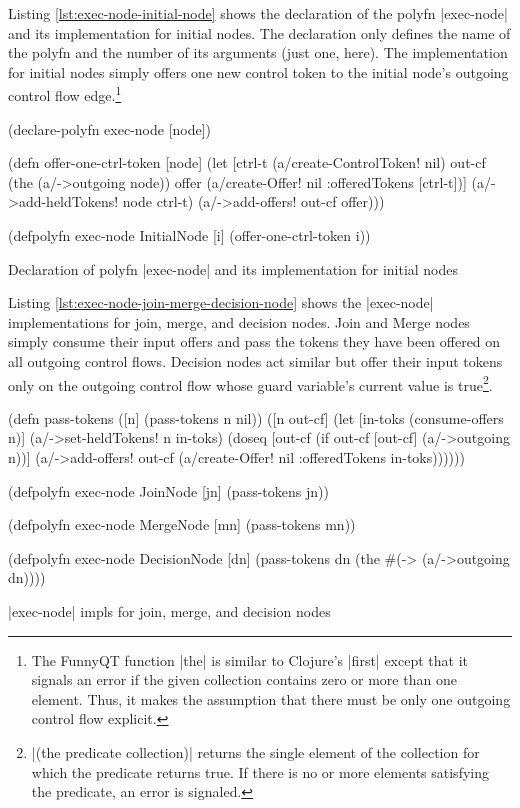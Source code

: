 \documentclass[submission]{eptcs}
\newcommand{\code}{\clojureinline}
\begin{document}
Listing \vref{lst:exec-node-initial-node} shows the declaration of the polyfn
\code|exec-node| and its implementation for initial nodes.  The declaration
only defines the name of the polyfn and the number of its arguments (just one,
here).  The implementation for initial nodes simply offers one new control
token to the initial node's outgoing control flow edge.\footnote{The FunnyQT
  function \code|the| is similar to Clojure's \code|first| except that it
  signals an error if the given collection contains zero or more than one
  element.  Thus, it makes the assumption that there must be only one outgoing
  control flow explicit.}

\begin{listing}[h!tb]
\begin{clojurecode}
(declare-polyfn exec-node [node])

(defn offer-one-ctrl-token [node]
  (let [ctrl-t (a/create-ControlToken! nil)
        out-cf (the (a/->outgoing node))
        offer  (a/create-Offer! nil {:offeredTokens [ctrl-t]})]
    (a/->add-heldTokens! node ctrl-t)
    (a/->add-offers! out-cf offer)))

(defpolyfn exec-node InitialNode [i]
  (offer-one-ctrl-token i))
\end{clojurecode}
\caption{Declaration of polyfn \code|exec-node| and its implementation for initial nodes}
\label{lst:exec-node-initial-node}
\end{listing}

Listing \vref{lst:exec-node-join-merge-decision-node} shows the
\code|exec-node| implementations for join, merge, and decision nodes.  Join and
Merge nodes simply consume their input offers and pass the tokens they have
been offered on all outgoing control flows.  Decision nodes act similar but
offer their input tokens only on the outgoing control flow whose guard
variable's current value is true\footnote{\code|(the predicate collection)|
  returns the single element of the collection for which the predicate returns
  true.  If there is no or more elements satisfying the predicate, an error is
  signaled.}.

\begin{listing}[h!tb]
\begin{clojurecode}
(defn pass-tokens
  ([n] (pass-tokens n nil))
  ([n out-cf]
   (let [in-toks (consume-offers n)]
     (a/->set-heldTokens! n in-toks)
     (doseq [out-cf (if out-cf [out-cf] (a/->outgoing n))]
       (a/->add-offers!
        out-cf (a/create-Offer!
                nil {:offeredTokens in-toks}))))))

(defpolyfn exec-node JoinNode [jn]
  (pass-tokens jn))

(defpolyfn exec-node MergeNode [mn]
  (pass-tokens mn))

(defpolyfn exec-node DecisionNode [dn]
  (pass-tokens dn (the #(-> %
                       (a/->outgoing dn))))
\end{clojurecode}
\caption{\code|exec-node| impls for join, merge, and decision nodes}
\label{lst:exec-node-join-merge-decision-node}
\end{listing}
\end{document}
